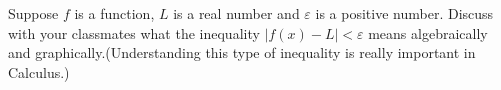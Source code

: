 {Suppose $f$ is a function, $L$ is a real number and $\varepsilon$ is a positive number.  Discuss with your classmates what the inequality $|f(x) - L| < \varepsilon$ means algebraically and graphically.(Understanding this type of inequality is really important in Calculus.)}
{}